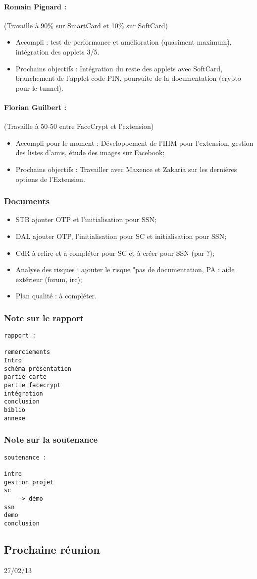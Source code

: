 \documentclass[a4paper,10pt]{article}
\begin{document}
\paragraph{Romain Pignard : } (Travaille à 90\% sur SmartCard et 10\% sur SoftCard)
\begin{itemize}
    \item Accompli : test de performance et amélioration (quasiment maximum),
    intégration des applets 3/5.
\item Prochains objectifs : Intégration du reste des applets avec SoftCard, 
   branchement de l'applet code PIN, poursuite de la documentation (crypto pour
           le tunnel).
\end{itemize}

\paragraph{Florian Guilbert : } (Travaille à 50-50 entre FaceCrypt et l'extension)
\begin{itemize}
    \item Accompli pour le moment : Développement de l'IHM pour l'extension,
    gestion des listes d'amis, étude des images sur Facebook;
\item Prochains objectifs : Travailler avec Maxence et Zakaria sur les 
dernières options de l'Extension.
\end{itemize}


\subsubsection*{Documents}
\begin{itemize}
    \item STB ajouter OTP et l'initialisation pour SSN;
    \item DAL ajouter OTP, l'initialisation pour SC et initialisation pour SSN;
    \item CdR à relire et à compléter pour SC et à créer pour SSN (par ?);
    \item Analyse des risques : ajouter le risque "pas de documentation, 
    PA : aide extérieur (forum, irc);
    \item Plan qualité : à compléter.
\end{itemize}

\subsubsection*{Note sur le rapport}
\begin{verbatim}
rapport :

remerciements
Intro
schéma présentation
partie carte
partie facecrypt
intégration
conclusion
biblio
annexe
\end{verbatim}
\subsubsection*{Note sur la soutenance}
\begin{verbatim}
soutenance :

intro
gestion projet
sc
    -> démo
ssn
demo
conclusion
\end{verbatim}

\subsection*{Prochaine réunion}
27/02/13
\end{document}
